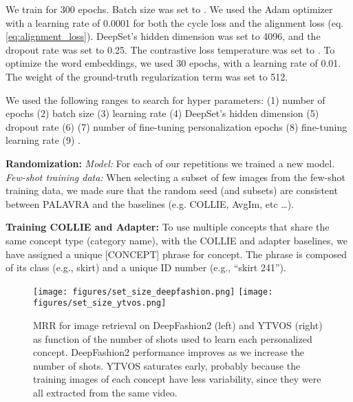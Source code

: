 \documentclass[runningheads]{llncs}
\newcommand{\concept}{[CONCEPT]}
\begin{document}
We train  for 300 epochs. Batch size was set to . We used the Adam \cite{kingma2014adam} optimizer with a learning rate of 0.0001 for both the cycle loss and the alignment loss (eq. \ref{eq:alignment_loss}). DeepSet's hidden dimension was set to 4096, and the dropout rate was set to 0.25. The contrastive loss temperature was set to . To optimize the word embeddings, we used 30 epochs, with a learning rate of 0.01. The weight of the ground-truth regularization term  was set to 512.

We used the following ranges to search for hyper parameters: (1) number of epochs  (2) batch size  (3) learning rate   (4) DeepSet's hidden dimension  (5) dropout rate  (6)  (7) number of fine-tuning personalization epochs  (8) fine-tuning learning rate  (9) . 



\vspace{15pt}\noindent\textbf{Randomization:} \textit{Model:} For each of our  repetitions we trained a new  model. \textit{Few-shot training data:} When selecting a subset of few images from the few-shot training data, we made sure that the random seed (and subsets) are consistent between PALAVRA and the baselines (e.g. COLLIE, AvgIm, etc \dots ).


\vspace{15pt}\noindent\textbf{Training COLLIE and Adapter:}
To use multiple concepts that share the same concept type (category name), with the COLLIE and adapter baselines, we have assigned  a unique \concept{} phrase for concept. The phrase is composed of its class (e.g., skirt) and a unique ID number (e.g., ``skirt 241'').




\begin{figure}[h]
    \centering   
    \texttt{[image: figures/set\_size\_deepfashion.png]} \texttt{[image: figures/set\_size\_ytvos.png]} \vspace{-5pt}
    \caption{ MRR for image retrieval on DeepFashion2 (left) and YTVOS (right) as function of the number of shots used to learn each personalized concept. DeepFashion2 performance improves as we increase the number of shots. YTVOS saturates early, probably because the training images of each concept have less variability, since they were all extracted from the same video.
    }

    \label{fig_set_size}
    \vspace{-5pt}
\end{figure}
\end{document}

